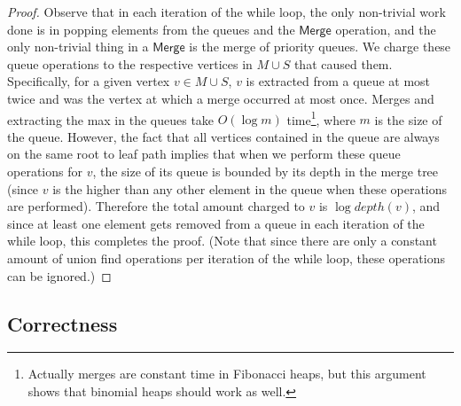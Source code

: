 \documentclass[A4paper,11pt]{article}
\newcommand{\Merge}{\mathsf{Merge}}
\begin{document}
\begin{proof}
Observe that in each iteration of the while loop, the only non-trivial work done is in popping elements from the queues and the $\Merge$ operation, and the only non-trivial thing in a $\Merge$ is the merge of priority queues.  We charge these queue operations to the respective vertices in $M\cup S$ that caused them.  Specifically, for a given vertex $v\in M\cup S$, $v$ is extracted from a queue at most twice and was the vertex at which a merge occurred at most once.  Merges and extracting the max in the queues take $O(\log m)$ time\footnote{Actually merges are constant time in Fibonacci heaps, but this argument shows that binomial heaps should work as well.}, where $m$ is the size of the queue.  However, the fact that all vertices contained in the queue are always on the same root to leaf path implies that when we perform these queue operations for $v$, the size of its queue is bounded by its depth in the merge tree (since $v$ is the higher than any other element in the queue when these operations are 
performed).  Therefore the total amount charged to $v$ is $\log depth(v)$, and since at least one element gets removed from a queue in each iteration of the while loop, this completes the proof.  (Note that since there are only a constant amount of union find operations per iteration of the while loop, these operations can be ignored.)
\end{proof}



\subsection{Correctness}
\end{document}
